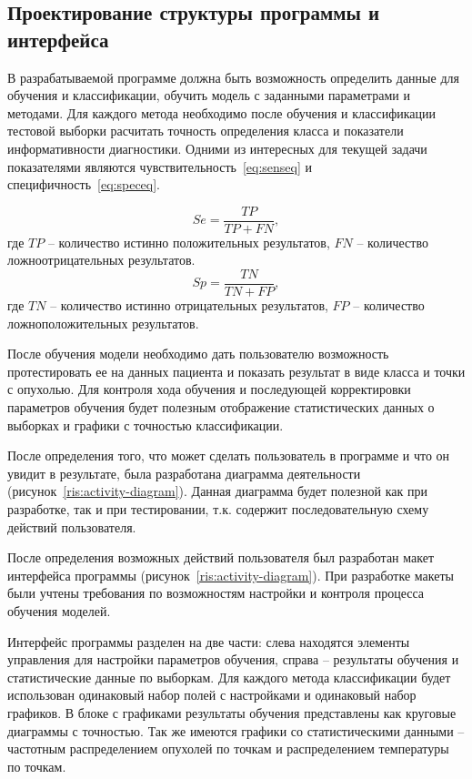 \subsection{Проектирование структуры программы и интерфейса}
В разрабатываемой программе должна быть возможность определить данные для обучения и классификации, обучить модель с заданными параметрами и методами. Для каждого метода необходимо после обучения и классификации тестовой выборки расчитать точность определения класса и показатели информативности диагностики. Одними из интересных для текущей задачи показателями являются чувствительность~\eqref{eq:senseq} и специфичность~\eqref{eq:speceq}.
\par
\begin{equation}\label{eq:senseq}
Se = \frac{TP}{TP + FN},
\end{equation}
где $TP$ -- количество истинно положительных результатов, $FN$ -- количество ложноотрицательных результатов.
\begin{equation}\label{eq:speceq}
Sp = \frac{TN}{TN + FP},
\end{equation}
где $TN$ -- количество истинно отрицательных результатов, $FP$ -- количество ложноположительных результатов.

\par
После обучения модели необходимо дать пользователю возможность протестировать ее на данных пациента и показать результат в виде класса и точки с опухолью. Для контроля хода обучения и последующей корректировки параметров обучения будет полезным отображение статистических данных о выборках и графики с точностью классификации.
\par
После определения того, что может сделать пользователь в программе и что он увидит в результате, была разработана диаграмма деятельности (рисунок~\ref{ris:activity-diagram}). Данная диаграмма будет полезной как при разработке, так и при тестировании, т.к. содержит последовательную схему действий пользователя.
\par
После определения возможных действий пользователя был разработан макет интерфейса программы (рисунок~\ref{ris:activity-diagram}). При разработке макеты были учтены требования по возможностям настройки и контроля процесса обучения моделей. 
\par
Интерфейс программы разделен на две части: слева находятся элементы управления для настройки параметров обучения, справа -- результаты обучения и статистические данные по выборкам. Для каждого метода классификации будет использован одинаковый набор полей с настройками и одинаковый набор графиков. В блоке с графиками результаты обучения представлены как круговые диаграммы с точностью. Так же имеются графики со статистическими данными -- частотным распределением опухолей по точкам и распределением температуры по точкам.


